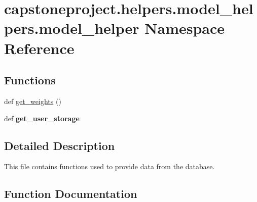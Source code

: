 \hypertarget{namespacecapstoneproject_1_1helpers_1_1model__helpers_1_1model__helper}{}\section{capstoneproject.\+helpers.\+model\+\_\+helpers.\+model\+\_\+helper Namespace Reference}
\label{namespacecapstoneproject_1_1helpers_1_1model__helpers_1_1model__helper}
\subsection*{Functions}
\begin{DoxyCompactItemize}
\item 
def \mbox{\hyperlink{namespacecapstoneproject_1_1helpers_1_1model__helpers_1_1model__helper_adc23780e6ae6cfdf974dd0e609817308}{get\+\_\+weights}} ()
\item 
\mbox{\label{namespacecapstoneproject_1_1helpers_1_1model__helpers_1_1model__helper_a5003a877c3f8471bb0fa754d7754af13}} 
def {\bfseries get\+\_\+user\+\_\+storage}
\end{DoxyCompactItemize}


\subsection{Detailed Description}
\begin{DoxyVerb}This file contains functions used to provide data from the database.
\end{DoxyVerb}
 

\subsection{Function Documentation}
\mbox{\label{namespacecapstoneproject_1_1helpers_1_1model__helpers_1_1model__helper_adc23780e6ae6cfdf974dd0e609817308}} 
